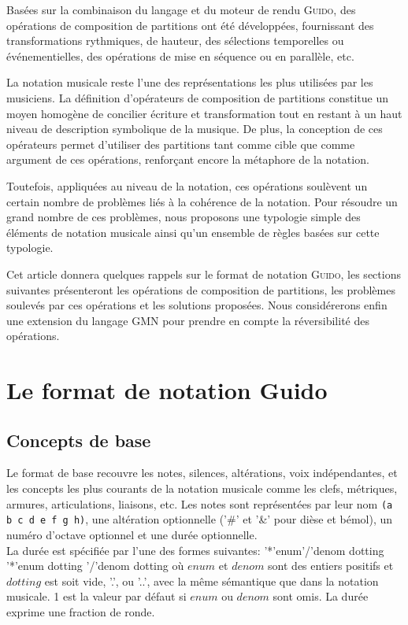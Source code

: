 \documentclass{article}
\newenvironment{gmncode}		{\vspace{-2mm}\small\verbatim}{\endverbatim\vspace{-2mm}}
\newcommand{\Guido}		{\textsc{Guido}}
\begin{document}
Basées sur la combinaison du langage et du moteur de rendu \Guido , des opérations de composition de partitions ont été développées, fournissant des transformations rythmiques, de hauteur, des sélections temporelles ou événementielles, des opérations de mise en séquence ou en parallèle, etc.

La notation musicale reste l'une des représentations les plus utilisées par les musiciens. La définition d'opérateurs de composition de partitions constitue un moyen homogène de concilier écriture et transformation tout en restant à un haut niveau de description symbolique de la musique. De plus, la conception de ces opérateurs permet d'utiliser des partitions tant comme cible que comme argument de ces opérations, renforçant encore la métaphore de la notation.

Toutefois, appliquées au niveau de la notation, ces opérations soulèvent un certain nombre de problèmes liés à la cohérence de la notation. Pour résoudre un grand nombre de ces problèmes, nous proposons une typologie simple des éléments de notation musicale ainsi qu'un ensemble de règles basées sur cette typologie.

Cet article donnera quelques rappels sur le format de notation \Guido , les sections suivantes présenteront les opérations de composition de partitions, les problèmes soulevés par ces opérations et les solutions proposées. Nous considérerons enfin une extension du langage GMN pour prendre  en compte la réversibilité des opérations.

\section{Le format de notation Guido}

\subsection{Concepts de base}
Le format de base recouvre les notes, silences, altérations, voix indépendantes, et les concepts les plus courants de la notation musicale comme les clefs, métriques, armures, articulations, liaisons, etc.
Les notes sont représentées par leur nom \texttt{(a b c d e f g h)}, une altération optionnelle ('\#' et '\&' pour dièse et bémol), un numéro d'octave optionnel et une durée optionnelle. \\
La durée est spécifiée par l'une des formes suivantes: 
\begin{gmncode} 
   '*'enum'/'denom dotting
   '*'enum dotting 
   '/'denom dotting
\end{gmncode} 
\noindent où $enum$ et $denom$ sont des entiers positifs et $dotting$ est soit vide, '.', ou '..', avec la même sémantique que dans la notation musicale. 1 est la valeur par défaut si $enum$ ou $denom$ sont omis. La durée exprime une fraction de ronde.
\end{document}
